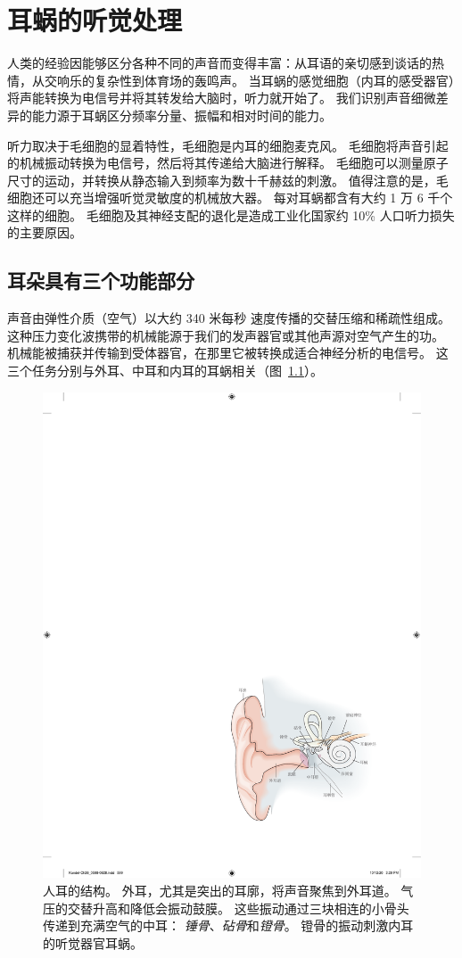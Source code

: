\chapter{耳蜗的听觉处理} \label{chap:chap26}

人类的经验因能够区分各种不同的声音而变得丰富：从耳语的亲切感到谈话的热情，从交响乐的复杂性到体育场的轰鸣声。
当耳蜗的感觉细胞（内耳的感受器官）将声能转换为电信号并将其转发给大脑时，听力就开始了。
我们识别声音细微差异的能力源于耳蜗区分频率分量、振幅和相对时间的能力。


听力取决于毛细胞的显着特性，毛细胞是内耳的细胞麦克风。
毛细胞将声音引起的机械振动转换为电信号，然后将其传递给大脑进行解释。
毛细胞可以测量原子尺寸的运动，并转换从静态输入到频率为数十千赫兹的刺激。
值得注意的是，毛细胞还可以充当增强听觉灵敏度的机械放大器。
每对耳蜗都含有大约 1 万 6 千个这样的细胞。
毛细胞及其神经支配的退化是造成工业化国家约 10\% 人口听力损失的主要原因。



\section{耳朵具有三个功能部分}

声音由弹性介质（空气）以大约 340 米每秒 速度传播的交替压缩和稀疏性组成。
这种压力变化波携带的机械能源于我们的发声器官或其他声源对空气产生的功。
机械能被捕获并传输到受体器官，在那里它被转换成适合神经分析的电信号。
这三个任务分别与外耳、中耳和内耳的耳蜗相关（图~\ref{fig:26_1}）。


\begin{figure}[htbp]
	\centering
	\includegraphics[width=0.7\linewidth]{chap26/fig_26_1}
	\caption{人耳的结构。 
		外耳，尤其是突出的耳廓，将声音聚焦到外耳道。
		气压的交替升高和降低会振动鼓膜。
		这些振动通过三块相连的小骨头传递到充满空气的中耳：
		\textit{锤骨}、\textit{砧骨}和\textit{镫骨}。 
		镫骨的振动刺激内耳的听觉器官耳蜗。}
	\label{fig:26_1}
\end{figure}


